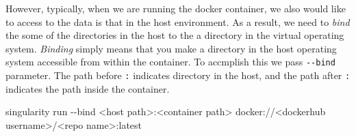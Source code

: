\documentclass[
  letterpaper,
  DIV=11,
  numbers=noendperiod]{scrartcl}
\newenvironment{Shaded}{\begin{snugshade}}{\end{snugshade}}
\newcommand{\ErrorTok}[1]{\textcolor[rgb]{0.68,0.00,0.00}{#1}}
\newcommand{\NormalTok}[1]{\textcolor[rgb]{0.00,0.23,0.31}{#1}}
\newcommand{\SpecialCharTok}[1]{\textcolor[rgb]{0.37,0.37,0.37}{#1}}
\begin{document}
However, typically, when we are running the docker container, we also
would like to access to the data is that in the host environment. As a
result, we need to \emph{bind} the some of the directories in the host
to the a directory in the virtual operating system. \emph{Binding}
simply means that you make a directory in the host operating system
accessible from within the container. To accmplish this we pass
\texttt{-\/-bind} parameter. The path before \texttt{:} indicates
directory in the host, and the path after \texttt{:} indicates the path
inside the container.

\begin{Shaded}
\begin{Highlighting}[]
\NormalTok{singularity run }\SpecialCharTok{{-}{-}}\NormalTok{bind }\SpecialCharTok{\textless{}}\NormalTok{host path}\SpecialCharTok{\textgreater{}}\ErrorTok{:\textless{}}\NormalTok{container path}\SpecialCharTok{\textgreater{}}\NormalTok{ docker}\SpecialCharTok{:}\ErrorTok{//\textless{}}\NormalTok{dockerhub username}\SpecialCharTok{\textgreater{}}\ErrorTok{/\textless{}}\NormalTok{repo name}\SpecialCharTok{\textgreater{}}\ErrorTok{:}\NormalTok{latest}
\end{Highlighting}
\end{Shaded}
\end{document}
